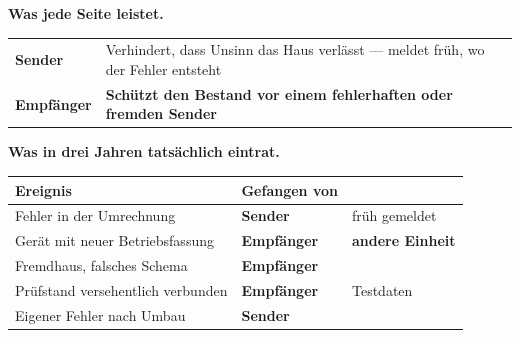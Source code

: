 \begin{merksatz}
\textbf{Was jede Seite leistet.}

\begin{center}
\renewcommand{\arraystretch}{1.5}
\begin{tabular}{@{}P{2.4cm}P{6.4cm}@{}}
\toprule
\textbf{Sender} & Verhindert, dass Unsinn das Haus verlässt --- meldet früh, wo der Fehler entsteht\\
\textbf{Empfänger} & \textbf{Schützt den Bestand vor einem fehlerhaften oder fremden Sender}\\
\bottomrule
\end{tabular}
\end{center}

\begin{center}
\begin{minipage}{0.88\textwidth}
\end{minipage}
\end{center}

\textbf{Was in drei Jahren tatsächlich eintrat.}

\begin{center}
{\small
\renewcommand{\arraystretch}{1.45}
\begin{tabular}{@{}P{3.0cm}P{2.0cm}P{2.6cm}@{}}
\toprule
\textbf{Ereignis} & \textbf{Gefangen von} & \\
\midrule
Fehler in der Umrechnung & \textbf{Sender} & \textcolor{gruen}{früh gemeldet}\\
Gerät mit neuer Betriebsfassung & \textcolor{akzent}{\textbf{Empfänger}} & \textcolor{akzent}{\textbf{andere Einheit}}\\
Fremdhaus, falsches Schema & \textbf{Empfänger} & \\
Prüfstand versehentlich verbunden & \textcolor{akzent}{\textbf{Empfänger}} & \textcolor{akzent}{Testdaten}\\
Eigener Fehler nach Umbau & \textbf{Sender} & \\
\bottomrule
\end{tabular}}
\end{center}

\begin{center}
\begin{minipage}{0.88\textwidth}
\end{minipage}
\end{center}
\end{merksatz}

